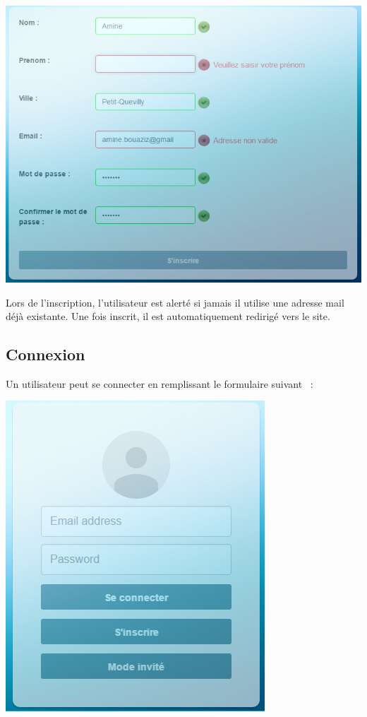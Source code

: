 \documentclass[hidelinks, 12pt,a4paper]{article}
\begin{document}
\begin{center}
\includegraphics[scale=0.8]{images/inscriptionnnvalid.png}\\
\end{center}

Lors de l'inscription, l'utilisateur est alerté si jamais il utilise une adresse mail déjà existante. Une fois inscrit, il est automatiquement redirigé vers le site.

\newpage
\subsection{Connexion}
Un utilisateur peut se connecter en remplissant le formulaire suivant ~:\\

\begin{center}
\includegraphics[scale=0.8]{images/connexion.png}\\
\end{center}
\end{document}
